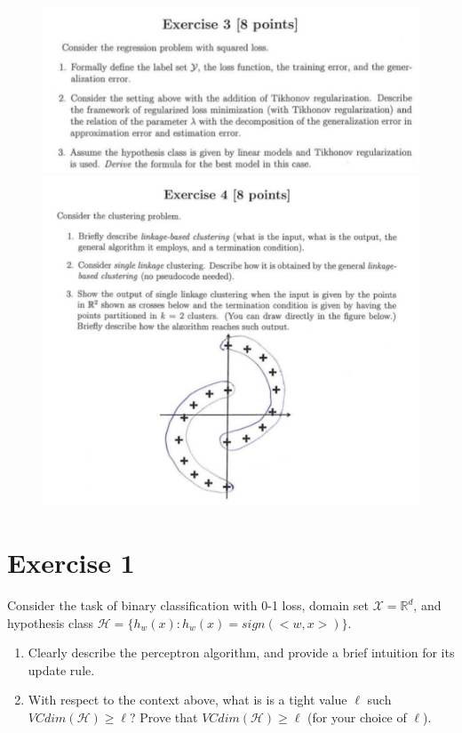 \documentclass[a4paper,11pt,oneside]{book}
\begin{document}
\begin{figure}[H]
    \centering
    \begin{minipage}{0.45\textwidth}
        \includegraphics[width=\textwidth,page=7]{images/ex3_16_Feb_2022.png}
    \end{minipage}
    \hfill
    \begin{minipage}{0.45\textwidth}
        \includegraphics[width=\textwidth,page=9]{images/ex4_16_Feb_2022.png}
    \end{minipage}
\end{figure}
\clearpage

\section{Exercise 1}
    Consider the task of binary classification with 0-1 loss, domain set $\mathcal{X} = \mathbb{R}^d$, and hypothesis class $\mathcal{H} = \{h_w(x): h_w(x) = sign(<w,x>)\}$.
    \begin{enumerate}
        \item Clearly describe the perceptron algorithm, and provide a brief intuition for its update rule.
        \item With respect to the context above, what is is a tight value $\ell$ such $VCdim(\mathcal{H}) \geq \ell$? Prove that $VCdim(\mathcal{H}) \geq \ell$ (for your choice of $\ell$).
    \end{enumerate}
\end{document}

